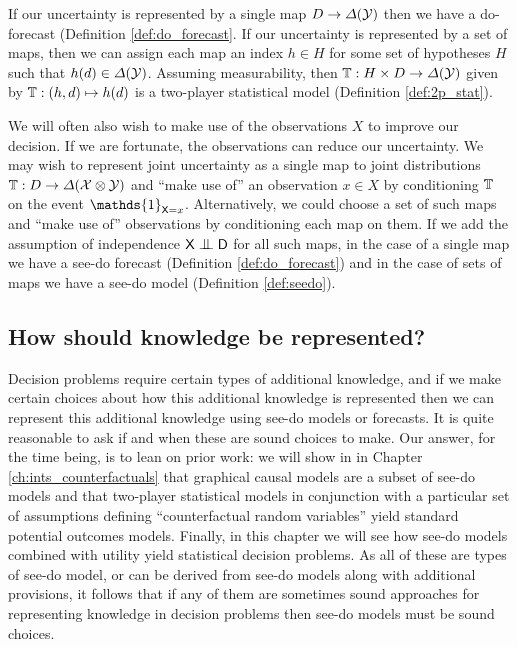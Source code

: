 If our uncertainty is represented by a single map $D\to \Delta(\mathcal{Y})$ then we have a do-forecast (Definition \ref{def:do_forecast}. If our uncertainty is represented by a set of maps, then we can assign each map an index $h\in H$ for some set of hypotheses $H$ such that $h(d)\in \Delta(\mathcal{Y})$. Assuming measurability, then $\mathbb{T}:H\times D\to \Delta(\mathcal{Y})$ given by $\mathbb{T}:(h,d)\mapsto h(d)$ is a two-player statistical model (Definition \ref{def:2p_stat}).

We will often also wish to make use of the observations $X$ to improve our decision. If we are fortunate, the observations can reduce our uncertainty. We may wish to represent joint uncertainty as a single map to joint distributions $\mathbb{T}:D\to \Delta(\mathcal{X}\otimes \mathcal{Y})$ and ``make use of'' an observation $x\in X$ by conditioning $\mathbb{T}$ on the event $\mathds{1}_{\RV{X}=x}$. Alternatively, we could choose a set of such maps and ``make use of'' observations by conditioning each map on them. If we add the assumption of independence $\RV{X}\CI \RV{D}$ for all such maps, in the case of a single map we have a see-do forecast (Definition \ref{def:do_forecast}) and in the case of sets of maps we have a see-do model (Definition \ref{def:seedo}).


\subsection{How should knowledge be represented?}

Decision problems require certain types of additional knowledge, and if we make certain choices about how this additional knowledge is represented then we can represent this additional knowledge using see-do models or forecasts. It is quite reasonable to ask if and when these are sound choices to make. Our answer, for the time being, is to lean on prior work: we will show in in Chapter \ref{ch:ints_counterfactuals} that graphical causal models are a subset of see-do models and that two-player statistical models in conjunction with a particular set of assumptions defining ``counterfactual random variables'' yield standard potential outcomes models. Finally, in this chapter we will see how see-do models combined with utility yield statistical decision problems. As all of these are types of see-do model, or can be derived from see-do models along with additional provisions, it follows that if any of them are sometimes sound approaches for representing knowledge in decision problems then see-do models must be sound choices.

